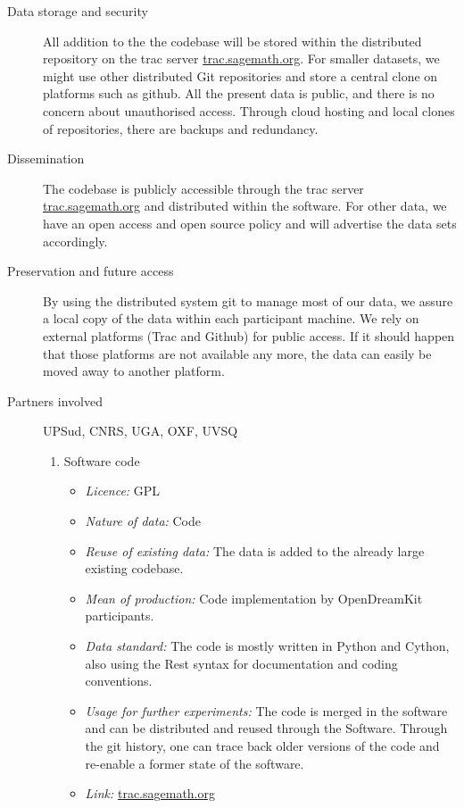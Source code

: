 \documentclass{deliverablereport}
\begin{document}
\begin{description}
\item[Data storage and security] All addition to the the \Sage codebase will be stored within the distributed \Sage repository on the trac server \href{http://trac.sagemath.org/}{trac.sagemath.org}. For smaller datasets, we might use other distributed Git repositories and store a central clone on platforms such as github. All the present data is public, and there is no concern about
unauthorised access. Through cloud hosting and local clones of
repositories, there are backups and redundancy.
\label{Sagesec}
\item[Dissemination] The \Sage codebase is publicly accessible through
  the trac server \href{http://trac.sagemath.org/}{trac.sagemath.org}
  and distributed within the \Sage software. For other data, we have an open access and open source policy and will advertise the data sets accordingly.
\label{Sagediss}
\item[Preservation and future access] By using the distributed system git to manage most of our data, we assure a local copy of the data within each participant machine. We rely on external platforms (Trac and Github) for public access. If it should happen that those platforms are not available any more, the data can easily be moved away to another platform.
\item[Partners involved] UPSud, CNRS, UGA, OXF, UVSQ
\label{Sagepres}


\begin{enumerate}
\item{Software code}
\begin{itemize}
\item\textit{Licence:} GPL
\item\textit{Nature of data:} Code
\item\textit{Reuse of existing data:} The data is added to the already large existing \Sage codebase.
\item\textit{Mean of production:} Code implementation by OpenDreamKit participants.
\item\textit{Data standard:} The code is mostly written in Python and Cython, also using the Rest syntax for documentation and \Sage coding conventions.
\item\textit{Usage for further experiments:} The code is merged in the software and can be distributed and reused through the Software. Through the git history,
one can trace back older versions of the code and re-enable a former state of the software.
\item\textit{Link:} \href{http://trac.sagemath.org/}{trac.sagemath.org}


\end{itemize}
\end{enumerate}
\end{description}
\end{document}
